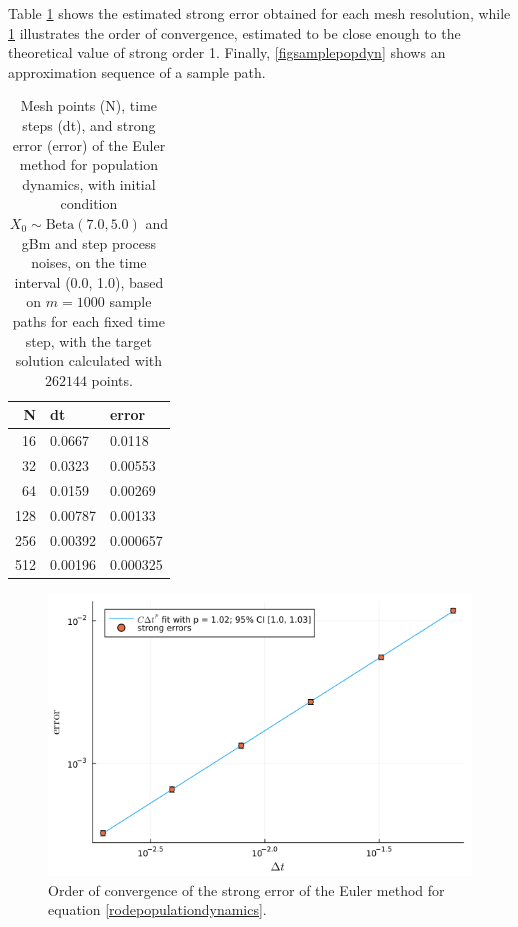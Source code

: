 \documentclass[reqno,12pt]{amsart}
\theoremstyle{plain} %
\theoremstyle{definition} %
\begin{document}
Table \ref{tabpopdyn} shows the estimated strong error obtained for each mesh resolution, while \cref{figpopdyn} illustrates the order of convergence, estimated to be close enough to the theoretical value of strong order 1. Finally, \cref{figsamplepopdyn} shows an approximation sequence of a sample path.

\begin{table}
    \begin{tabular}[htb]{|r|l|l|}
        \hline N & dt & error\\
        \hline \hline
        16 & 0.0667 & 0.0118 \\
        32 & 0.0323 & 0.00553 \\
        64 & 0.0159 & 0.00269 \\
        128 & 0.00787 & 0.00133 \\
        256 & 0.00392 & 0.000657 \\
        512 & 0.00196 & 0.000325 \\
        \hline
    \end{tabular}
    \bigskip

    \caption{Mesh points (N), time steps (dt), and strong error (error) of the Euler method for population dynamics, with initial condition $X_0 \sim \mathrm{Beta}(7.0, 5.0)$ and gBm and step process noises, on the time interval (0.0, 1.0), based on $m = 1000$ sample paths for each fixed time step, with the target solution calculated with $262144$ points.}
    \label{tabpopdyn}
\end{table}

\begin{figure}[htb]
    \includegraphics[scale=0.6]{img/order_popdyn_gBmPoisson.png}
    \caption{Order of convergence of the strong error of the Euler method for equation \eqref{rodepopulationdynamics}.}
    \label{figpopdyn}
\end{figure}
\end{document}
